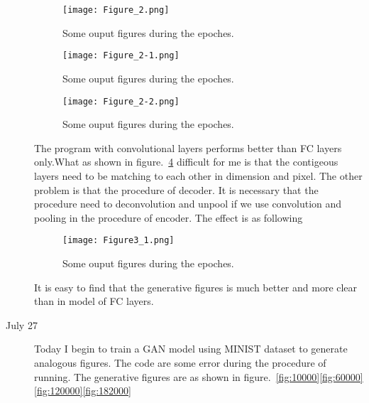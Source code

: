 \documentclass[a4paper]{article}
\begin{document}
\begin{description}
\begin{figure}[!htp]
	\begin{center}
		\texttt{[image: Figure\_2.png]}
	\end{center}
	\caption{Some ouput figures during the epoches.}
	\label{fig:Figure_2}
\end{figure}

\begin{figure}[!htp]
	\begin{center}
		\texttt{[image: Figure\_2-1.png]}
	\end{center}
	\caption{Some ouput figures during the epoches.}
	\label{fig:Figure_2-1}
\end{figure}

\begin{figure}[!htp]
	\begin{center}
		\texttt{[image: Figure\_2-2.png]}
	\end{center}
	\caption{Some ouput figures during the epoches.}
	\label{fig:Figure_2-2}
\end{figure}\par

The program with convolutional layers performs better than FC layers only.What as shown in figure.~\ref{fig:Figure3_1}  difficult for me is that the contigeous layers need to be matching to each other in dimension and pixel. The other problem is that the procedure of decoder. It is necessary that the procedure need to deconvolution and unpool if we use convolution and pooling in the procedure of encoder. The effect is as following

\begin{figure}[!htp]
	\begin{center}
		\texttt{[image: Figure3\_1.png]}
	\end{center}
	\caption{Some ouput figures during the epoches.}
	\label{fig:Figure3_1}
\end{figure}\par

It is easy to find that the generative figures is much better and more clear than in model of FC layers.\par

\item[July 27]
Today I begin to train a GAN model using MINIST dataset to generate analogous figures. The code are some error during the procedure of running. The generative figures are as shown in figure.~\ref*{fig:10000}\ref{fig:60000}\ref{fig:120000}\ref{fig:182000}


\end{description}
\end{document}
